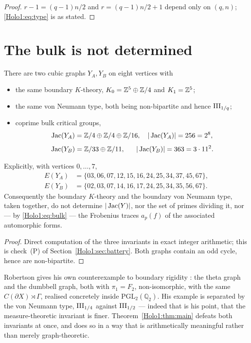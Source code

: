 \begin{proof}
$r-1=(q-1)n/2$ and $r=(q-1)n/2+1$ depend only on $(q,n)$; \eqref{Holo1:eq:type} is as stated.
\end{proof}

\section{The bulk is not determined}\label{Holo1:sec:main}

\begin{theorem}\label{Holo1:thm:main}
There are two cubic graphs $Y_A,Y_B$ on eight vertices with
\begin{itemize}
\item the same boundary $K$-theory, $K_0=\mathbb{Z}^{5}\oplus\mathbb{Z}/4$ and $K_1=\mathbb{Z}^{5}$;
\item the same von Neumann type, both being non-bipartite and hence $\mathrm{III}_{1/q}$;
\item coprime bulk critical groups,
\[
\operatorname{Jac}(Y_A)=\mathbb{Z}/4\oplus\mathbb{Z}/4\oplus\mathbb{Z}/16,\quad |\operatorname{Jac}(Y_A)|=256=2^{8},
\]
\[
\Jac(Y_B)=\Z/33\oplus\Z/11,\quad\ \ |\Jac(Y_B)|=363=3\cdot11^{2}.
\]
\end{itemize}
Explicitly, with vertices $0,\dots,7$,
\[
\begin{aligned}
E(Y_A)&=\{03,06,07,12,15,16,24,25,34,37,45,67\},\\
E(Y_B)&=\{02,03,07,14,16,17,24,25,34,35,56,67\}.
\end{aligned}
\]
Consequently the boundary $K$-theory and the boundary von Neumann type, taken together, do
not determine $|\operatorname{Jac}(Y)|$, nor the set of primes dividing it, nor --- by \eqref{Holo1:eq:bulk}
--- the Frobenius traces $a_p(f)$ of the associated automorphic forms.
\end{theorem}

\begin{proof}
Direct computation of the three invariants in exact integer arithmetic; this is check~(P)
of Section~\ref{Holo1:sec:battery}. Both graphs contain an odd cycle, hence are non-bipartite.
\end{proof}

\begin{remark}\label{Holo1:rem:compare}
Robertson gives his own counterexample to boundary rigidity \cite[Ex.~1.5]{Rob05}: the
theta graph and the dumbbell graph, both with $\pi_1=F_2$, non-isomorphic, with the same
$C(\partial X)\rtimes\Gamma$, realised concretely inside $\mathrm{PGL}_2(\mathbb Q_2)$. His
example is separated by the von Neumann type, $\mathrm{III}_{1/4}$ against $\mathrm{III}_{1/2}$ --- indeed
that is his point, that the measure-theoretic invariant is finer. Theorem~\ref{Holo1:thm:main}
defeats both invariants at once, and does so in a way that is arithmetically meaningful
rather than merely graph-theoretic.
\end{remark}

